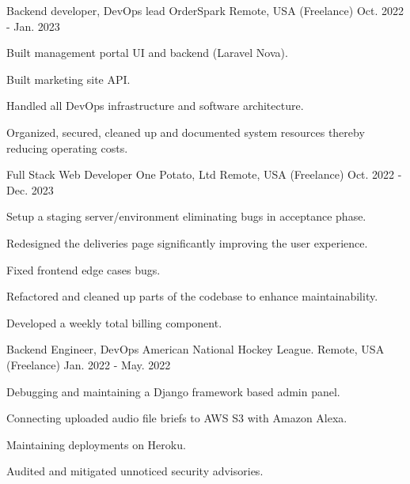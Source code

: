 \begin{cventries}
  \cventry
    {Backend developer, DevOps lead} %
    {OrderSpark} %
    {Remote, USA (Freelance)} %
    {Oct. 2022 - Jan. 2023} %
    {
      \begin{cvitems} %
        \item {Built management portal UI and backend (Laravel Nova).}
        \item {Built marketing site API.}
        \item {Handled all DevOps infrastructure and software architecture.}
        \item {Organized, secured, cleaned up and documented system resources thereby reducing operating costs.}
      \end{cvitems}
    }

  \cventry
    {Full Stack Web Developer} %
    {One Potato, Ltd} %
    {Remote, USA (Freelance)} %
    {Oct. 2022 - Dec. 2023} %
    {
      \begin{cvitems} %
        \item {Setup a staging server/environment eliminating bugs in acceptance phase.}
        \item {Redesigned the deliveries page significantly improving the user experience.}
        \item {Fixed frontend edge cases bugs.}
        \item {Refactored and cleaned up parts of the codebase to enhance maintainability.}
        \item {Developed a weekly total billing component.}
      \end{cvitems}
    }

  \cventry
    {Backend Engineer, DevOps} %
    {American National Hockey League.} %
    {Remote, USA (Freelance)} %
    {Jan. 2022 - May. 2022} %
    {
      \begin{cvitems} %
        \item {Debugging and maintaining a Django framework based admin panel.}
        \item {Connecting uploaded audio file briefs to AWS S3 with Amazon Alexa.}
        \item {Maintaining deployments on Heroku.}
        \item {Audited and mitigated unnoticed security advisories.}
      \end{cvitems}
    }


\end{cventries}
